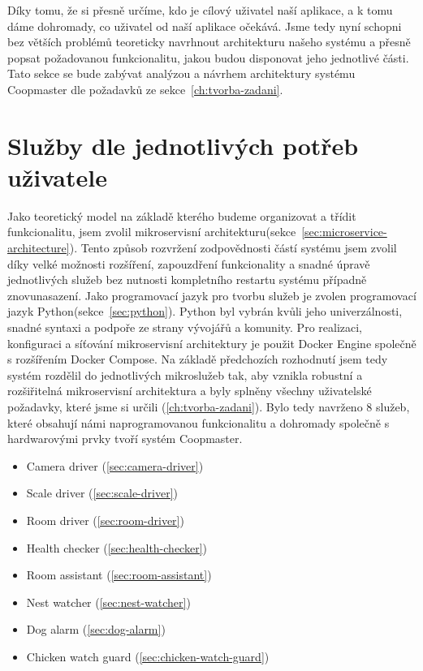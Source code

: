 

Díky tomu, že si přesně určíme, kdo je cílový uživatel naší aplikace, a k tomu dáme dohromady, co uživatel od naší aplikace očekává.
Jsme tedy nyní schopni bez větších problémů teoreticky navrhnout architekturu našeho systému a přesně popsat požadovanou funkcionalitu, jakou budou disponovat jeho jednotlivé části.
Tato sekce se bude zabývat analýzou a návrhem architektury systému Coopmaster dle požadavků ze sekce~\ref{ch:tvorba-zadani}.

\section{Služby dle jednotlivých potřeb uživatele}\label{sec:microservices}
Jako teoretický model na základě kterého budeme organizovat a třídit funkcionalitu, jsem zvolil mikroservisní architekturu(sekce~\ref{sec:microservice-architecture}).
Tento způsob rozvržení zodpovědnosti částí systému jsem zvolil díky velké možnosti rozšíření, zapouzdření funkcionality a snadné úpravě jednotlivých služeb bez nutnosti kompletního restartu systému případně znovunasazení.\newline
Jako programovací jazyk pro tvorbu služeb je zvolen programovací jazyk Python(sekce~\ref{sec:python}).
Python byl vybrán kvůli jeho univerzálnosti, snadné syntaxi a podpoře ze strany vývojářů a komunity.\newline
Pro realizaci, konfiguraci a síťování mikroservisní architektury je použit Docker Engine společně s rozšířením Docker Compose.\newline
Na základě předchozích rozhodnutí jsem tedy systém rozdělil do jednotlivých mikroslužeb tak, aby vznikla robustní a rozšiřitelná mikroservisní architektura a byly splněny všechny uživatelské požadavky, které jsme si určili (\ref{ch:tvorba-zadani}).\newline
Bylo tedy navrženo 8 služeb, které obsahují námi naprogramovanou funkcionalitu a dohromady společně s hardwarovými prvky tvoří systém Coopmaster.
\begin{itemize}
    \item Camera driver (\ref{sec:camera-driver})
    \item Scale driver (\ref{sec:scale-driver})
    \item Room driver (\ref{sec:room-driver})
    \item Health checker (\ref{sec:health-checker})
    \item Room assistant (\ref{sec:room-assistant})
    \item Nest watcher (\ref{sec:nest-watcher})
    \item Dog alarm (\ref{sec:dog-alarm})
    \item Chicken watch guard (\ref{sec:chicken-watch-guard})
\end{itemize}

